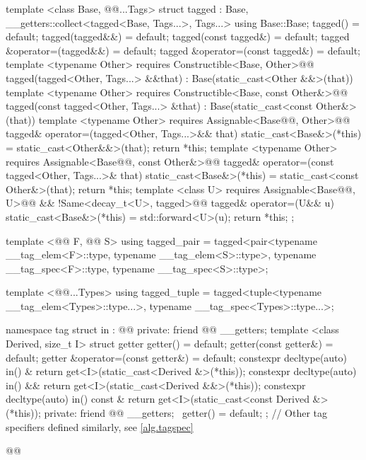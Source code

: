 \begin{codeblock}
{  template <class Base, @@...Tags>
  struct tagged
    : Base, __getters::collect<tagged<Base, Tags...>, Tags...> {
    using Base::Base;
    tagged() = default;
    tagged(tagged&&) = default;
    tagged(const tagged&) = default;
    tagged &operator=(tagged&&) = default;
    tagged &operator=(const tagged&) = default;
    template <typename Other>
      requires Constructible<Base, Other>@\newtxt{()}@
    tagged(tagged<Other, Tags...> &&that)
      : Base(static_cast<Other &&>(that)) { }
    template <typename Other>
      requires Constructible<Base, const Other&>@\newtxt{()}@
    tagged(const tagged<Other, Tags...> &that)
      : Base(static_cast<const Other&>(that)) { }
    template <typename Other>
      requires Assignable<Base@\newtxt{\&}@, Other>@\newtxt{()}@
    tagged& operator=(tagged<Other, Tags...>&& that) {
      static_cast<Base&>(*this) = static_cast<Other&&>(that);
      return *this;
    }
    template <typename Other>
      requires Assignable<Base@\newtxt{\&}@, const Other&>@\newtxt{()}@
    tagged& operator=(const tagged<Other, Tags...>& that) {
      static_cast<Base&>(*this) = static_cast<const Other&>(that);
      return *this;
    }
    template <class U>
      requires Assignable<Base@\newtxt{\&}@, U>@\newtxt{()}@ && !Same<decay_t<U>, tagged>@\newtxt{()}@
    tagged& operator=(U&& u) {
      static_cast<Base&>(*this) = std::forward<U>(u);
      return *this;
    }
  };

  template <@@ F, @@ S>
  using tagged_pair =
    tagged<pair<typename __tag_elem<F>::type, typename __tag_elem<S>::type>,
           typename __tag_spec<F>::type, typename __tag_spec<S>::type>;

  template <@@...Types>
  using tagged_tuple =
    tagged<tuple<typename __tag_elem<Types>::type...>,
           typename __tag_spec<Types>::type...>;

  namespace tag {
    struct in : @@ {
    private:
      friend @@ __getters;
      template <class Derived, size_t I>
      struct getter {
        getter() = default;
        getter(const getter&) = default;
        getter &operator=(const getter&) = default;
        constexpr decltype(auto) in() & {
          return get<I>(static_cast<Derived &>(*this));
        }
        constexpr decltype(auto) in() && {
          return get<I>(static_cast<Derived &&>(*this));
        }
        constexpr decltype(auto) in() const & {
          return get<I>(static_cast<const Derived &>(*this));
        }
      private:
        friend @@ __getters;
        ~getter() = default;
      };
    }
    // Other tag specifiers defined similarly, see \ref{alg.tagspec}
  }
}@\newtxt{\}\}\}}@
\end{codeblock}
